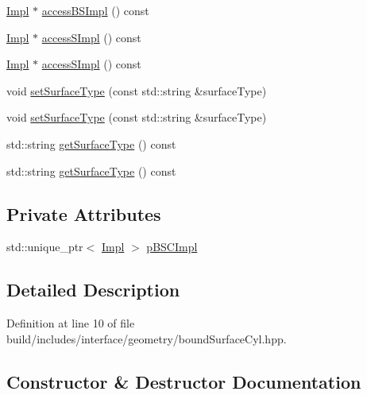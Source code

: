 \begin{DoxyCompactItemize}
\item 
\hyperlink{classMcCAD_1_1Geometry_1_1BoundSurfaceCyl_1_1Impl}{Impl} $\ast$ \hyperlink{classMcCAD_1_1Geometry_1_1BoundSurface_a7b638aa31593926d6210aad6a30e1f47}{access\+B\+S\+Impl} () const
\item 
\hyperlink{classMcCAD_1_1Geometry_1_1BoundSurfaceCyl_1_1Impl}{Impl} $\ast$ \hyperlink{classMcCAD_1_1Geometry_1_1Surface_a989de1f9ebe3de043412014ed25e52eb}{access\+S\+Impl} () const
\item 
\hyperlink{classMcCAD_1_1Geometry_1_1BoundSurfaceCyl_1_1Impl}{Impl} $\ast$ \hyperlink{classMcCAD_1_1Geometry_1_1Surface_adafee834670eb8c97025e24ffd6df844}{access\+S\+Impl} () const
\item 
void \hyperlink{classMcCAD_1_1Geometry_1_1Surface_a976893834481e58569db0d35db2ba969}{set\+Surface\+Type} (const std\+::string \&surface\+Type)
\item 
void \hyperlink{classMcCAD_1_1Geometry_1_1Surface_a976893834481e58569db0d35db2ba969}{set\+Surface\+Type} (const std\+::string \&surface\+Type)
\item 
std\+::string \hyperlink{classMcCAD_1_1Geometry_1_1Surface_ac81308cae2d3fd458dfa311adea23688}{get\+Surface\+Type} () const
\item 
std\+::string \hyperlink{classMcCAD_1_1Geometry_1_1Surface_ac81308cae2d3fd458dfa311adea23688}{get\+Surface\+Type} () const
\end{DoxyCompactItemize}
\subsection*{Private Attributes}
\begin{DoxyCompactItemize}
\item 
std\+::unique\+\_\+ptr$<$ \hyperlink{classMcCAD_1_1Geometry_1_1BoundSurfaceCyl_1_1Impl}{Impl} $>$ \hyperlink{classMcCAD_1_1Geometry_1_1BoundSurfaceCyl_a01b2ad0ca6e49c27d8fd65e43e7a3cb9}{p\+B\+S\+C\+Impl}
\end{DoxyCompactItemize}


\subsection{Detailed Description}


Definition at line 10 of file build/includes/interface/geometry/bound\+Surface\+Cyl.\+hpp.



\subsection{Constructor \& Destructor Documentation}
\mbox{\label{classMcCAD_1_1Geometry_1_1BoundSurfaceCyl_af24dcff5a5272064a23985d082e37d08}} 
